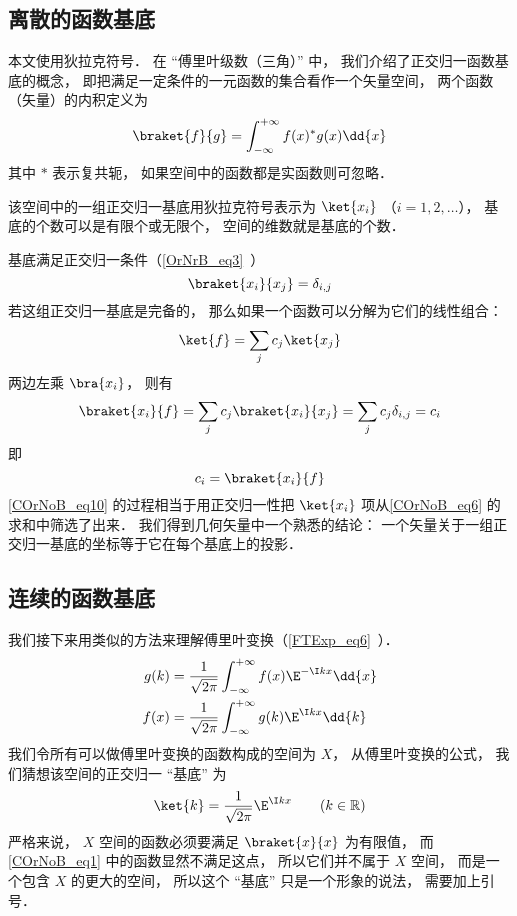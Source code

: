 

\subsection{离散的函数基底}
本文使用狄拉克符号． 在 “傅里叶级数（三角）” 中， 我们介绍了正交归一函数基底的概念， 即把满足一定条件的一元函数的集合看作一个矢量空间， 两个函数（矢量）的内积定义为
\begin{equation}
\braket{f}{g} = \int_{-\infty}^{+\infty} f(x)^* g(x) \dd{x}
\end{equation}
其中 $*$ 表示复共轭， 如果空间中的函数都是实函数则可忽略．

该空间中的一组正交归一基底用狄拉克符号表示为 $\ket{x_i}$ （$i = 1, 2,\dots$）， 基底的个数可以是有限个或无限个， 空间的维数就是基底的个数．

基底满足正交归一条件（\autoref{OrNrB_eq3}~）
\begin{equation}\label{COrNoB_eq2}
\braket{x_i}{x_j} = \delta_{i,j}
\end{equation}
若这组正交归一基底是完备的， 那么如果一个函数可以分解为它们的线性组合：
\begin{equation}\label{COrNoB_eq6}
\ket{f} = \sum_j c_j\ket{x_j}
\end{equation}
两边左乘 $\bra{x_i}$， 则有
\begin{equation}\label{COrNoB_eq10}
\braket{x_i}{f} = \sum_j c_j\braket{x_i}{x_j} = \sum_j c_j \delta_{i,j} = c_i
\end{equation}
即
\begin{equation}\label{COrNoB_eq5}
c_i = \braket{x_i}{f}
\end{equation}
\autoref{COrNoB_eq10} 的过程相当于用正交归一性把 $\ket{x_i}$ 项从\autoref{COrNoB_eq6} 的求和中筛选了出来． 我们得到几何矢量中一个熟悉的结论： 一个矢量关于一组正交归一基底的坐标等于它在每个基底上的投影．

\subsection{连续的函数基底}
我们接下来用类似的方法来理解傅里叶变换（\autoref{FTExp_eq6}~）．
\begin{align}\label{COrNoB_eq4}
g(k) &= \frac{1}{\sqrt{2\pi }} \int_{-\infty }^{+\infty } f(x)\E^{-\I kx} \dd{x} \\
\label{COrNoB_eq3}f(x) &= \frac{1}{\sqrt{2\pi }} \int_{-\infty }^{+\infty } g(k)\E^{\I kx} \dd{k}
\end{align}
我们令所有可以做傅里叶变换的函数构成的空间为 $X$， 从傅里叶变换的公式， 我们猜想该空间的正交归一 “基底” 为
\begin{equation}\label{COrNoB_eq1}
\ket{k} = \frac{1}{\sqrt{2\pi}} \E^{\I kx} \qquad (k \in \mathbb R)
\end{equation}
严格来说， $X$ 空间的函数必须要满足 $\braket{x}{x}$ 为有限值， 而\autoref{COrNoB_eq1} 中的函数显然不满足这点， 所以它们并不属于 $X$ 空间， 而是一个包含 $X$ 的更大的空间， 所以这个 “基底” 只是一个形象的说法， 需要加上引号．

